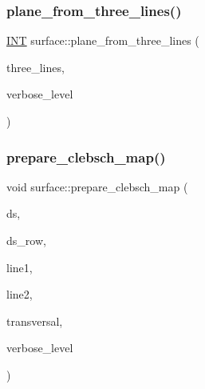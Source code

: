 \subsubsection{\texorpdfstring{plane\+\_\+from\+\_\+three\+\_\+lines()}{plane\_from\_three\_lines()}}
{\footnotesize\ttfamily \mbox{\hyperlink{galois_8h_a09fddde158a3a20bd2dcadb609de11dc}{I\+NT}} surface\+::plane\+\_\+from\+\_\+three\+\_\+lines (\begin{DoxyParamCaption}\item[{\mbox{\hyperlink{galois_8h_a09fddde158a3a20bd2dcadb609de11dc}{I\+NT}} $\ast$}]{three\+\_\+lines,  }\item[{\mbox{\hyperlink{galois_8h_a09fddde158a3a20bd2dcadb609de11dc}{I\+NT}}}]{verbose\+\_\+level }\end{DoxyParamCaption})}

\mbox{\label{classsurface_a161049e1f375321e5774c913b3b34ac6}} 
\subsubsection{\texorpdfstring{prepare\+\_\+clebsch\+\_\+map()}{prepare\_clebsch\_map()}}
{\footnotesize\ttfamily void surface\+::prepare\+\_\+clebsch\+\_\+map (\begin{DoxyParamCaption}\item[{\mbox{\hyperlink{galois_8h_a09fddde158a3a20bd2dcadb609de11dc}{I\+NT}}}]{ds,  }\item[{\mbox{\hyperlink{galois_8h_a09fddde158a3a20bd2dcadb609de11dc}{I\+NT}}}]{ds\+\_\+row,  }\item[{\mbox{\hyperlink{galois_8h_a09fddde158a3a20bd2dcadb609de11dc}{I\+NT}} \&}]{line1,  }\item[{\mbox{\hyperlink{galois_8h_a09fddde158a3a20bd2dcadb609de11dc}{I\+NT}} \&}]{line2,  }\item[{\mbox{\hyperlink{galois_8h_a09fddde158a3a20bd2dcadb609de11dc}{I\+NT}} \&}]{transversal,  }\item[{\mbox{\hyperlink{galois_8h_a09fddde158a3a20bd2dcadb609de11dc}{I\+NT}}}]{verbose\+\_\+level }\end{DoxyParamCaption})}

\mbox{\label{classsurface_ae1ba711bbcd929ba49cb9729f37c0300}} 
